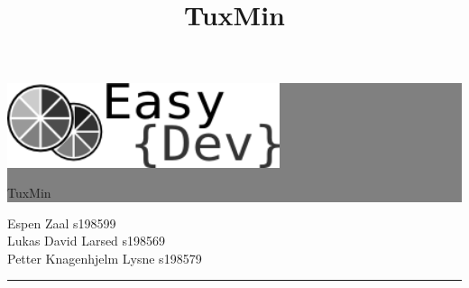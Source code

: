 \setlength{\oddsidemargin}{0mm} %
\setlength{\evensidemargin}{0mm} %

\newcommand{\HRule}[1]{\hfill \rule{0.2\linewidth}{#1}} %



\thispagestyle{empty} %


\colorbox{grey}{
	\parbox[t]{1.0\linewidth}{
		\centering \fontsize{50pt}{80pt}\selectfont %
		\vspace*{0.7cm} %
		
		\hfill 
		\includegraphics[width=80mm]{./img/fremside/logo.png} \\
		\hfill 
		\fontsize{30pt}{50pt}\selectfont 
		{\selectfont 
		TuxMin
		\title{TuxMin}
		}
		\par
		
		\vspace*{0.5cm} %
	}
}


\vfill %


{\centering \large 
\hfill Espen Zaal s198599 \\
\hfill Lukas David Larsed s198569 \\
\hfill Petter Knagenhjelm Lysne s198579 \\



\HRule{1pt}} %


\clearpage %